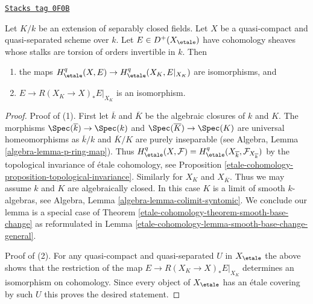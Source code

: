\begin{lemma}
\label{etale-cohomology-lemma-smooth-base-change-separably-closed}
\href{https://stacks.math.columbia.edu/tag/0F0B}{\texttt{Stacks tag 0F0B}}

Let $K/k$ be an extension of separably closed fields. Let $X$
be a quasi-compact and quasi-separated scheme over $k$.
Let $E \in D^+(X_\etale)$ have cohomology sheaves whose stalks
are torsion of orders invertible in $k$. Then
\begin{enumerate}
\item the maps $H^q_\etale(X, E) \to H^q_\etale(X_K, E|_{X_K})$
are isomorphisms, and
\item $E \to R(X_K \to X)_*E|_{X_K}$ is an isomorphism.
\end{enumerate}
\end{lemma}

\begin{proof}
Proof of (1). First let $\overline{k}$ and $\overline{K}$
be the algebraic closures
of $k$ and $K$. The morphisms $\Spec(\overline{k}) \to \Spec(k)$ and
$\Spec(\overline{K}) \to \Spec(K)$ are universal homeomorphisms
as $\overline{k}/k$ and $\overline{K}/K$ are purely inseparable
(see Algebra, Lemma \ref{algebra-lemma-p-ring-map}).
Thus $H^q_\etale(X, \mathcal{F}) =
H^q_\etale(X_{\overline{k}}, \mathcal{F}_{X_{\overline{k}}})$ by
the topological invariance of \'etale cohomology, see
Proposition \ref{etale-cohomology-proposition-topological-invariance}.
Similarly for $X_K$ and $X_{\overline{K}}$.
Thus we may assume $k$ and $K$ are algebraically closed.
In this case $K$ is a limit of smooth $k$-algebras, see
Algebra, Lemma \ref{algebra-lemma-colimit-syntomic}.
We conclude our lemma is a special case of
Theorem \ref{etale-cohomology-theorem-smooth-base-change} as reformulated in
Lemma \ref{etale-cohomology-lemma-smooth-base-change-general}.

\medskip\noindent
Proof of (2). For any quasi-compact and quasi-separated $U$ in $X_\etale$
the above shows that the restriction of the map
$E \to R(X_K \to X)_*E|_{X_K}$ determines an isomorphism on cohomology.
Since every object of $X_\etale$ has an \'etale covering by such $U$
this proves the desired statement.
\end{proof}

